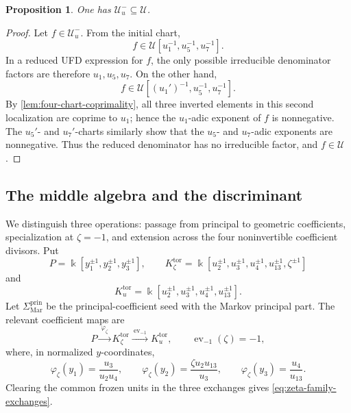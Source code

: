 \documentclass[11pt,reqno]{amsart}
\numberwithin{equation}{section}
\newtheorem{proposition}[proposition]{Proposition}
\theoremstyle{remark}
\newcommand{\kk}{\Bbbk}
\newcommand{\UR}{\mathscr U}
\newcommand{\Uneg}{\mathcal U_u^{-}}
\begin{document}
\begin{proposition}
\label{prop:upper-contained-in-invariants}
One has $\Uneg\subseteq\UR$.
\end{proposition}

\begin{proof}
Let $f\in\Uneg$.  From the initial chart,
\[ f\in\UR[u_1^{-1},u_5^{-1},u_7^{-1}]. \]
In a reduced UFD expression for $f$, the only possible irreducible
denominator factors are therefore $u_1,u_5,u_7$.  On the other hand,
\[ f\in\UR[(u_1')^{-1},u_5^{-1},u_7^{-1}]. \]
By \cref{lem:four-chart-coprimality}, all three inverted elements in this
second localization are coprime to $u_1$; hence the $u_1$-adic exponent
of $f$ is nonnegative.  The $u_5'$- and $u_7'$-charts similarly show
that the $u_5$- and $u_7$-adic exponents are nonnegative.  Thus the
reduced denominator has no irreducible factor, and $f\in\UR$.
\end{proof}

\subsection{The middle algebra and the discriminant}
\label{subsec:middle-extension}

We distinguish three operations: passage from principal to geometric
coefficients, specialization at $\zeta=-1$, and extension across the four
noninvertible coefficient divisors.  Put
\[ P=\kk[y_1^{\pm1},y_2^{\pm1},y_3^{\pm1}], \qquad K_\zeta^{\mathrm{tor}}=\kk[u_2^{\pm1},u_3^{\pm1},u_4^{\pm1},u_{13}^{\pm1},\zeta^{\pm1}] \]
and
\[ K_u^{\mathrm{tor}} =\kk[u_2^{\pm1},u_3^{\pm1},u_4^{\pm1},u_{13}^{\pm1}]. \]
Let $\Sigma_{\mathrm{Mar}}^{\mathrm{prin}}$ be the principal-coefficient
seed with the Markov principal part.  The relevant coefficient maps are
\[ P\xrightarrow{\ \varphi_\zeta\ }K_\zeta^{\mathrm{tor}} \xrightarrow{\ \operatorname{ev}_{-1}\ }K_u^{\mathrm{tor}}, \qquad \operatorname{ev}_{-1}(\zeta)=-1, \]
where, in normalized $y$-coordinates,
\begin{equation}
\label{eq:principal-coefficient-specialization}
 \varphi_\zeta(y_1)=\frac{u_3}{u_2u_4},\qquad
 \varphi_\zeta(y_2)=\frac{\zeta u_2u_{13}}{u_3},\qquad
 \varphi_\zeta(y_3)=\frac{u_4}{u_{13}}.
\end{equation}
Clearing the common frozen units in the three exchanges gives
\eqref{eq:zeta-family-exchanges}.
\end{document}
